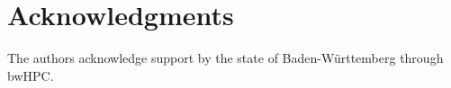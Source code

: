 \section*{Acknowledgments}
The authors acknowledge support by the state of Baden-Württemberg through bwHPC.